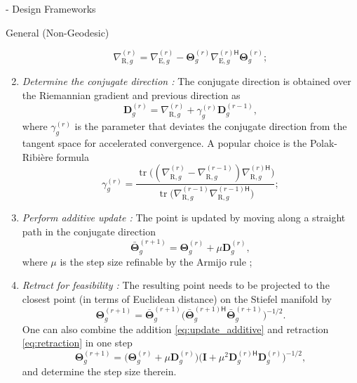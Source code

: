 \documentclass[journal]{IEEEtran}
\DeclareMathOperator{\tr}{tr}
\begin{document}
\begin{section}{- Design Frameworks}
\begin{subsection}{General (Non-Geodesic) }
\begin{enumerate}
\begin{equation}
				\nabla_{\mathrm{R},g}^{(r)} = \nabla_{\mathrm{E},g}^{(r)} - \mathbf{\Theta}_g^{(r)} {\nabla_{\mathrm{E},g}^{(r)\mathsf{H}}} \mathbf{\Theta}_g^{(r)};
				\label{eq:gradient_riemannian}
			\end{equation}
			\item \emph{Determine the conjugate direction \cite{Nocedal2006}:} The conjugate direction is obtained over the Riemannian gradient and previous direction as
			\begin{equation}
				\mathbf{D}_g^{(r)} = \nabla_{\mathrm{R},g}^{(r)} + \gamma_g^{(r)} \mathbf{D}_g^{(r-1)}, %
				\label{eq:direction_cg}
			\end{equation}
			where $\gamma_g^{(r)}$ is the parameter that deviates the conjugate direction from the tangent space for accelerated convergence. A popular choice is the Polak-Ribi\`{e}re formula
			\begin{equation}
				\gamma_g^{(r)} = \frac{\tr\bigl((\nabla_{\mathrm{R},g}^{(r)} - \nabla_{\mathrm{R},g}^{(r-1)}) {\nabla_{\mathrm{R},g}^{(r)\mathsf{H}}}\bigr)}{\tr\bigl(\nabla_{\mathrm{R},g}^{(r-1)} {\nabla_{\mathrm{R},g}^{(r-1)\mathsf{H}}}\bigr)}; %
				\label{eq:parameter_cg}
			\end{equation}
			\item \emph{Perform additive update \cite{Pan2022d}:} The point is updated by moving along a straight path in the conjugate direction
			\begin{equation}
				\bar{\mathbf{\Theta}}_g^{(r+1)} = \mathbf{\Theta}_g^{(r)} + \mu \mathbf{D}_g^{(r)},
				\label{eq:update_additive}
			\end{equation}
			where $\mu$ is the step size refinable by the Armijo rule \cite{Armijo1966};
			\item \emph{Retract for feasibility \cite{Absil2009,Li2023b}:} The resulting point needs to be projected to the closest point (in terms of Euclidean distance) on the Stiefel manifold by
			\begin{equation}
				\mathbf{\Theta}_g^{(r+1)} = \bar{\mathbf{\Theta}}_g^{(r+1)} \bigl({\bar{\mathbf{\Theta}}_g^{(r+1)\mathsf{H}}} \bar{\mathbf{\Theta}}_g^{(r+1)}\bigr)^{-1/2}.
				\label{eq:retraction}
			\end{equation}
			One can also combine the addition \eqref{eq:update_additive} and retraction \eqref{eq:retraction} in one step
			\begin{equation}
				\mathbf{\Theta}_g^{(r+1)} = \bigl(\mathbf{\Theta}_g^{(r)} + \mu \mathbf{D}_g^{(r)}\bigr) \bigl( \mathbf{I} + \mu^2 {\mathbf{D}_g^{(r)\mathsf{H}}} \mathbf{D}_g^{(r)} \bigr)^{-1/2},
				\label{eq:add_then_retract}
			\end{equation}
			and determine the step size therein.
		\end{enumerate}


\end{subsection}
\end{section}
\end{document}
